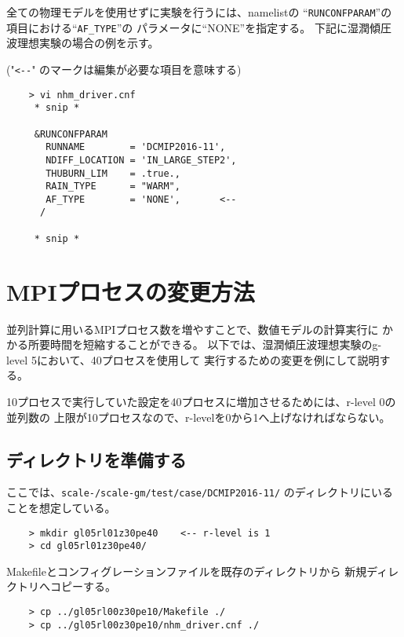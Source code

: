
 \noindent 全ての物理モデルを使用せずに実験を行うには、namelistの
``\verb|RUNCONFPARAM|''の項目における``\verb|AF_TYPE|''の
パラメータに``NONE''を指定する。
下記に湿潤傾圧波理想実験の場合の例を示す。


 ("\verb|<--|" のマークは編集が必要な項目を意味する)
 \begin{verbatim}
    > vi nhm_driver.cnf
     * snip *

     &RUNCONFPARAM
       RUNNAME        = 'DCMIP2016-11',
       NDIFF_LOCATION = 'IN_LARGE_STEP2',
       THUBURN_LIM    = .true.,
       RAIN_TYPE      = "WARM",
       AF_TYPE        = 'NONE',       <--
      /

     * snip *
 \end{verbatim}



\section{MPIプロセスの変更方法}
 \noindent 並列計算に用いるMPIプロセス数を増やすことで、数値モデルの計算実行に
かかる所要時間を短縮することができる。
以下では、湿潤傾圧波理想実験のg-level 5において、40プロセスを使用して
実行するための変更を例にして説明する。

10プロセスで実行していた設定を40プロセスに増加させるためには、r-level 0の並列数の
上限が10プロセスなので、r-levelを0から1へ上げなければならない。

\subsection{ディレクトリを準備する}
 ここでは、\texttt{scale-{\version}/scale-gm/test/case/DCMIP2016-11/} のディレクトリにいることを想定している。
 \begin{verbatim}
    > mkdir gl05rl01z30pe40    <-- r-level is 1
    > cd gl05rl01z30pe40/
 \end{verbatim}

 \noindent Makefileとコンフィグレーションファイルを既存のディレクトリから
新規ディレクトリへコピーする。
 \begin{verbatim}
    > cp ../gl05rl00z30pe10/Makefile ./
    > cp ../gl05rl00z30pe10/nhm_driver.cnf ./
 \end{verbatim}


